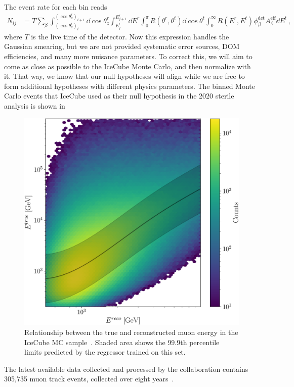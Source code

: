 The event rate for each bin reads
\begin{align}\label{eq:ICevents}
    N_{ij} &= T \sum_\beta\int_{(\cos{\theta_z^r})_i}^{(\cos{\theta_z^r})_{i+1}} \dd \cos{\theta^r_z} \int_{E^r_{j}}^{E^r_{j+1}} \dd E^r 
    \int_0^\pi R(\theta^r,\theta^t) \dd \cos{\theta^t} \int_0^\infty R(E^r,E^t) \phi_\beta^\text{det}  A^\text{eff}_\beta \dd E^t
    \,,
\end{align}
where $T$ is the live time of the detector. Now this expression handles the Gaussian smearing, but we are not provided systematic error sources, DOM efficiencies, and many more nuisance parameters. To correct this,
we will aim to come as close as possible to the IceCube Monte Carlo, and then normalize with it. That way, we know that our null hypotheses will align while we are free to form additional hypotheses with different 
physics parameters. The binned Monte Carlo events that IceCube used as their null hypothesis in the 2020 sterile analysis is shown in %


\begin{figure}[!tb]
    \begin{center}
       \includegraphics[width=0.4\linewidth]{figures/IC_MC_gpr.pdf}
    \end{center}
    \caption{Relationship between the true and reconstructed muon energy in the IceCube MC sample~\cite{IC2016}.
    Shaded area shows the $99.9$th percentile limits predicted by the regressor trained on this set.}\label{fig:IC_MC_gpr}
 \end{figure}

The latest available data collected and processed by the collaboration contains 305,735 muon track events, collected over eight years~\cite{IC2020}. 

